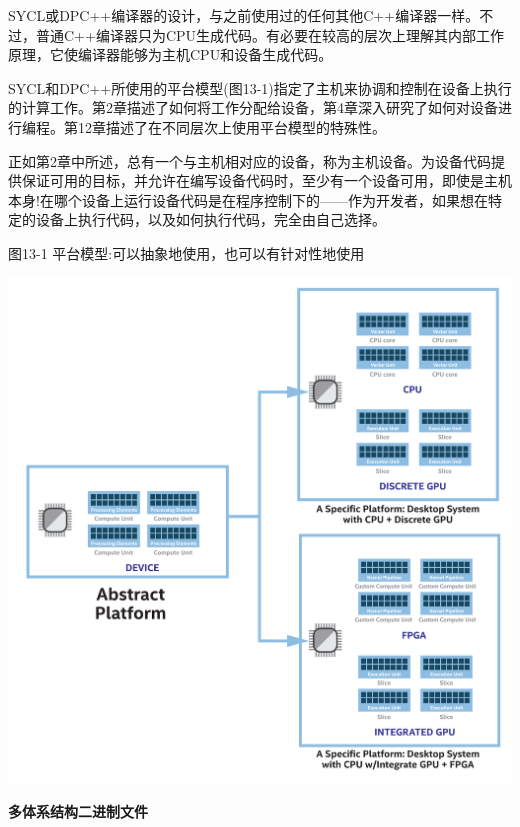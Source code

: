 SYCL或DPC++编译器的设计，与之前使用过的任何其他C++编译器一样。不过，普通C++编译器只为CPU生成代码。有必要在较高的层次上理解其内部工作原理，它使编译器能够为主机CPU和设备生成代码。\par

SYCL和DPC++所使用的平台模型(图13-1)指定了主机来协调和控制在设备上执行的计算工作。第2章描述了如何将工作分配给设备，第4章深入研究了如何对设备进行编程。第12章描述了在不同层次上使用平台模型的特殊性。\par

正如第2章中所述，总有一个与主机相对应的设备，称为主机设备。为设备代码提供保证可用的目标，并允许在编写设备代码时，至少有一个设备可用，即使是主机本身!在哪个设备上运行设备代码是在程序控制下的——作为开发者，如果想在特定的设备上执行代码，以及如何执行代码，完全由自己选择。\par

\hspace*{\fill} \par %
图13-1 平台模型:可以抽象地使用，也可以有针对性地使用
\begin{center}
	\includegraphics[width=1.\textwidth]{content/chapter-13/images/2}
\end{center}

\hspace*{\fill} \par %
\textbf{多体系结构二进制文件}

